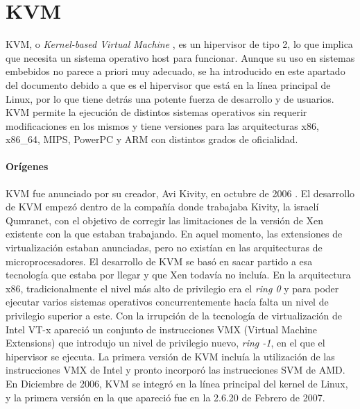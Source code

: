 \section{KVM}
KVM, o \textit{Kernel-based Virtual Machine} \cite{kvm_list}, es un hipervisor de tipo 2, lo que implica que necesita un sistema operativo host para funcionar. Aunque su uso en sistemas embebidos no parece a priori muy adecuado,
se ha introducido en este apartado del documento debido a que es el hipervisor que está en la línea principal de Linux, por lo que tiene detrás una potente fuerza de desarrollo y de usuarios.\\
KVM permite la ejecución de distintos sistemas operativos sin requerir modificaciones en los mismos y tiene versiones para las arquitecturas x86, x86\_64, MIPS, PowerPC y ARM con distintos grados de oficialidad.


\paragraph{Orígenes}
KVM fue anunciado por su creador, Avi Kivity, en octubre de 2006 \cite{kvm_2}. El desarrollo de KVM empezó dentro de la compañía donde trabajaba Kivity, la israelí Qumranet, con el objetivo de corregir las limitaciones de la versión de Xen existente con la que estaban trabajando. En aquel momento, las extensiones de virtualización estaban anunciadas, pero no existían en las arquitecturas de microprocesadores. El desarrollo de KVM se basó en sacar partido a esa tecnología que estaba por llegar y que Xen todavía no incluía. En la arquitectura x86, tradicionalmente el nivel más alto de privilegio era el \textit{ring 0} y para poder ejecutar varios sistemas operativos concurrentemente hacía falta un nivel de privilegio superior a este. Con la irrupción de la tecnología de virtualización de Intel VT-x apareció un conjunto de instrucciones VMX (Virtual Machine Extensions) que introdujo un nivel de privilegio nuevo, \textit{ring -1}, en el que el hipervisor se ejecuta. La primera versión de KVM incluía la utilización de las instrucciones VMX de Intel y pronto incorporó las instrucciones SVM de AMD. En Diciembre de 2006, KVM se integró en la línea principal del kernel de Linux, y la primera versión en la que apareció fue en la 2.6.20 de Febrero de 2007.

